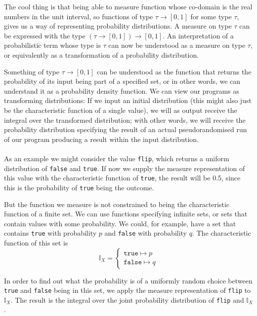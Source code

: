 \documentclass[11pt, leqno, titlepage]{article}
\theoremstyle{definition}
\begin{document}
The cool thing is that being able to measure function whose co-domain is the real
numbers in the unit interval, so functions of type $\tau\to[0,1]$ for some type
$\tau$, gives us a way of representing probability distributions. A measure on type
$\tau$ can be expressed with the type $(\tau\to[0,1])\to[0,1]$. An interpretation of
a probabilistic term whose type is $\tau$ can now be understood as a measure on type
$\tau$, or equivalently as a transformation of a probability distribution.

Something of type $\tau\to[0,1]$ can be understood as the function that returns the
probability of its input being part of a specified set, or in other words, we can
understand it as a probability density function. We can view our programs as
transforming distributions: If we input an initial distribution (this might also just
be the characteristic function of a single value), we will as output receive the
integral over the transformed distribution; with other words, we will receive the
probability distribution specifying the result of an actual pseudorandomised run of
our program producing a result within the input distribution.\\
\\
As an example we might consider the value \texttt{flip}, which returns a uniform
distribution of \texttt{false} and \texttt{true}. If now we supply the measure
representation of this value with the characteristic function of \texttt{true}, the
result will be 0.5, since this is the probability of \texttt{true} being the
outcome.

But the function we measure is not constrained to being the characteristic function
of a finite set. We can use functions specifying infinite sets, or sets that contain
values with some probability. 
We could, for example, have a set that contains \texttt{true} with
probability $p$ and \texttt{false} with probability $q$.
The characteristic function of this set is
$$\mathbb{I}_X =
\begin{cases}
  \texttt{true} \mapsto p\\
  \texttt{false} \mapsto q
\end{cases}$$
 
In order to find out what the probability is of a uniformly random choice between
\texttt{true} and \texttt{false} being in this set, we apply the measure
representation of \texttt{flip} to $\mathbb{I}_X$. The result is the integral over
the joint probability distribution of \texttt{flip} and $\mathbb{I}_X$. 
\end{document}
